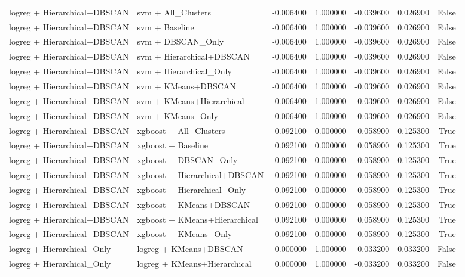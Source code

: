 \begin{tabular}{llrrrrr}
logreg + Hierarchical+DBSCAN & svm + All_Clusters & -0.006400 & 1.000000 & -0.039600 & 0.026900 & False \\
logreg + Hierarchical+DBSCAN & svm + Baseline & -0.006400 & 1.000000 & -0.039600 & 0.026900 & False \\
logreg + Hierarchical+DBSCAN & svm + DBSCAN_Only & -0.006400 & 1.000000 & -0.039600 & 0.026900 & False \\
logreg + Hierarchical+DBSCAN & svm + Hierarchical+DBSCAN & -0.006400 & 1.000000 & -0.039600 & 0.026900 & False \\
logreg + Hierarchical+DBSCAN & svm + Hierarchical_Only & -0.006400 & 1.000000 & -0.039600 & 0.026900 & False \\
logreg + Hierarchical+DBSCAN & svm + KMeans+DBSCAN & -0.006400 & 1.000000 & -0.039600 & 0.026900 & False \\
logreg + Hierarchical+DBSCAN & svm + KMeans+Hierarchical & -0.006400 & 1.000000 & -0.039600 & 0.026900 & False \\
logreg + Hierarchical+DBSCAN & svm + KMeans_Only & -0.006400 & 1.000000 & -0.039600 & 0.026900 & False \\
logreg + Hierarchical+DBSCAN & xgboost + All_Clusters & 0.092100 & 0.000000 & 0.058900 & 0.125300 & True \\
logreg + Hierarchical+DBSCAN & xgboost + Baseline & 0.092100 & 0.000000 & 0.058900 & 0.125300 & True \\
logreg + Hierarchical+DBSCAN & xgboost + DBSCAN_Only & 0.092100 & 0.000000 & 0.058900 & 0.125300 & True \\
logreg + Hierarchical+DBSCAN & xgboost + Hierarchical+DBSCAN & 0.092100 & 0.000000 & 0.058900 & 0.125300 & True \\
logreg + Hierarchical+DBSCAN & xgboost + Hierarchical_Only & 0.092100 & 0.000000 & 0.058900 & 0.125300 & True \\
logreg + Hierarchical+DBSCAN & xgboost + KMeans+DBSCAN & 0.092100 & 0.000000 & 0.058900 & 0.125300 & True \\
logreg + Hierarchical+DBSCAN & xgboost + KMeans+Hierarchical & 0.092100 & 0.000000 & 0.058900 & 0.125300 & True \\
logreg + Hierarchical+DBSCAN & xgboost + KMeans_Only & 0.092100 & 0.000000 & 0.058900 & 0.125300 & True \\
logreg + Hierarchical_Only & logreg + KMeans+DBSCAN & 0.000000 & 1.000000 & -0.033200 & 0.033200 & False \\
logreg + Hierarchical_Only & logreg + KMeans+Hierarchical & 0.000000 & 1.000000 & -0.033200 & 0.033200 & False \\

\end{tabular}
